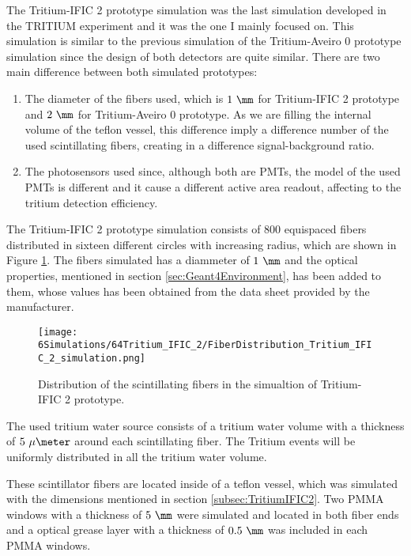 The Tritium-IFIC 2 prototype simulation was the last simulation developed in the TRITIUM experiment and it was the one I mainly focused on. This simulation is similar to the previous simulation of the Tritium-Aveiro 0 prototype simulation since the design of both detectors are quite similar. There are two main difference between both simulated prototypes:

\begin{enumerate}

\item{} The diameter of the fibers used, which is $1~\mm$ for Tritium-IFIC 2 prototype and $2~\mm$ for Tritium-Aveiro 0 prototype. As we are filling the internal volume of the teflon vessel, this difference imply a difference number of the used scintillating fibers, creating in a difference signal-background ratio.

\item{} The photosensors used since, although both are PMTs, the model of the used PMTs is different and it cause a different active area readout, affecting to the tritium detection efficiency. 

\end{enumerate}

The Tritium-IFIC 2 prototype simulation consists of $800$ equispaced fibers distributed in sixteen different circles with increasing radius, which are shown in Figure \ref{fig:FibersTritiumIFIC2Simulation}. The fibers simulated has a diammeter of $1~\mm$ and the optical properties, mentioned in section \ref{sec:Geant4Environment}, has been added to them, whose values has been obtained from the data sheet provided by the manufacturer.

\begin{figure}[h]
\centering
\texttt{[image: 6Simulations/64Tritium\_IFIC\_2/FiberDistribution\_Tritium\_IFIC\_2\_simulation.png]}
\caption{Distribution of the scintillating fibers in the simualtion of Tritium-IFIC 2 prototype.\label{fig:FibersTritiumIFIC2Simulation}}
\end{figure}

The used tritium water source consists of a tritium water volume with a thickness of $5~\mu\meter$ around each scintillating fiber. The Tritium events will be uniformly distributed in all the tritium water volume. 

These scintillator fibers are located inside of a teflon vessel, which was simulated with the dimensions mentioned in section \ref{subsec:TritiumIFIC2}. Two PMMA windows with a thickness of $5~\mm$ were simulated and located in both fiber ends and a optical grease layer with a thickness of $0.5~\mm$ was included in each PMMA windows.


